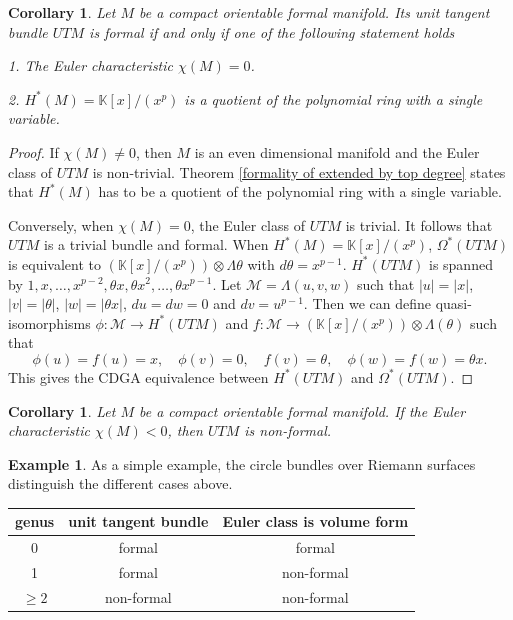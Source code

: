 \documentclass{article}
\theoremstyle{plain}
\newtheorem{cor}[thm]{Corollary}
\theoremstyle{definition}
\newtheorem{ex}[thm]{Example}
\theoremstyle{plain}
\numberwithin{equation}{section}
\begin{document}
\begin{cor}
Let $M$ be a compact orientable formal manifold. Its unit tangent bundle $UTM$ is formal if and only if one of the following statement holds

1. The Euler characteristic $\chi(M)=0$.

2. $H^*(M)=\mathbb{K}[x]/(x^p)$ is a quotient of the polynomial ring with a single variable.
\end{cor}
\begin{proof}
If $\chi(M)\neq 0$, then $M$ is an even dimensional manifold and the Euler class of $UTM$ is non-trivial. Theorem \ref{formality of extended by top degree} states that $H^*(M)$ has to be a quotient of the polynomial ring with a single variable.

Conversely, when $\chi(M)=0$, the Euler class of $UTM$ is trivial. It follows that $UTM$ is a trivial bundle and formal. When $H^*(M)=\mathbb{K}[x]/(x^p)$, $\Omega^*(UTM)$ is equivalent to $\left(\mathbb{K}[x]/(x^p)\right)\otimes\Lambda\theta$ with $d\theta=x^{p-1}$. $H^*(UTM)$ is spanned by $1,x,\ldots,x^{p-2},\theta x,\theta x^2,\ldots,\theta x^{p-1}$. Let $\mathcal{M}=\Lambda(u,v,w)$ such that $|u|=|x|$, $|v|=|\theta|$, $|w|=|\theta x|$, $du=dw=0$ and $dv=u^{p-1}$. Then we can define quasi-isomorphisms $\phi:\mathcal{M}\to H^*(UTM)$ and $f:\mathcal{M}\to \left(\mathbb{K}[x]/(x^p)\right)\otimes\Lambda(\theta)$ such that
$$
\phi(u)=f(u)=x,\quad \phi(v)=0,\quad f(v)=\theta,\quad \phi(w)=f(w)=\theta x.
$$
This gives the CDGA equivalence between $H^*(UTM)$ and $\Omega^*(UTM)$.
\end{proof}

\begin{cor}
Let $M$ be a compact orientable formal manifold. If the Euler characteristic $\chi(M)<0$, then $UTM$ is non-formal.
\end{cor}

\begin{ex}
As a simple example, the circle bundles over Riemann surfaces distinguish the different cases above.
\begin{center}

\begin{tabular}{|c|c|c|}
\hline
genus & unit tangent bundle & Euler class is volume form \\
\hline
0 & formal & formal \\
\hline
1 & formal & non-formal \\
\hline
$\geq 2$ & non-formal & non-formal \\
\hline
\end{tabular}
\end{center}
\end{ex}
\end{document}
